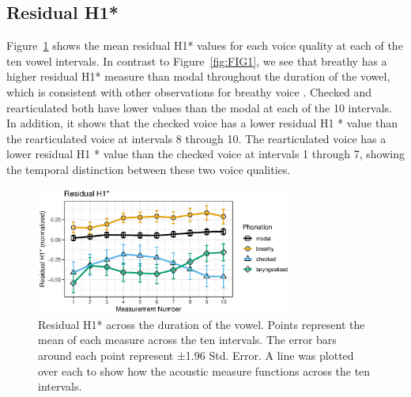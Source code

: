 \subsection{Residual H1*} \label{sec:ResidH1}

Figure~\ref{fig:FIG2} shows the mean residual H1* values for each voice quality at each of the ten vowel intervals. In contrast to Figure~\ref{fig:FIG1}, we see that breathy has a higher residual H1* measure than modal throughout the duration of the vowel, which is consistent with other observations for breathy voice \citep{fischer-jorgensenPhoneticAnalysisBreathy1968}. Checked and rearticulated both have lower values than the modal at each of the 10 intervals. In addition, it shows that the checked voice has a lower residual H1 * value than the rearticulated voice at intervals 8 through 10. The rearticulated voice has a lower residual H1 * value than the checked voice at intervals 1 through 7, showing the temporal distinction between these two voice qualities. 

\begin{figure}[htbp]
  \centering
  \includegraphics[width = 0.75\textwidth]{images/Figure2.eps}
  \caption{\label{fig:FIG2}{Residual H1* across the duration of the vowel. Points represent the mean of each measure across the ten intervals. The error bars around each point represent ±1.96 Std. Error. A line was plotted over each to show how the acoustic measure functions across the ten intervals.}}
\end{figure}

